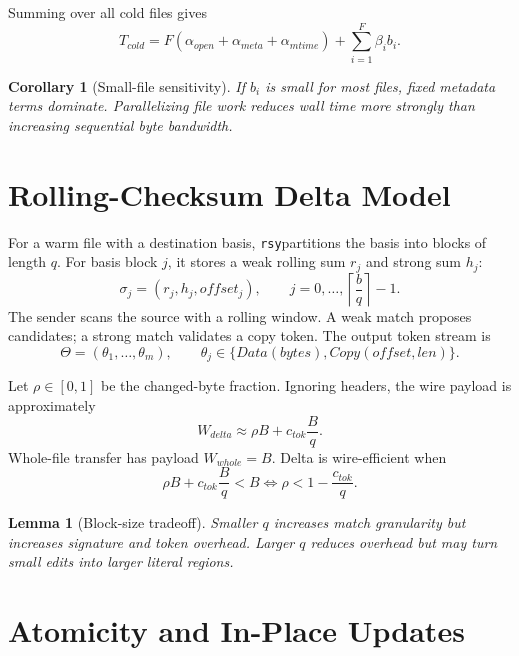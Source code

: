 \documentclass[11pt]{article}
\newtheorem{lemma}{Lemma}
\newtheorem{corollary}{Corollary}
\newcommand{\rsy}{\texttt{rsy}}
\begin{document}
Summing over all cold files gives
\begin{equation}
  T_{cold} = F(\alpha_{open}+\alpha_{meta}+\alpha_{mtime}) + \sum_{i=1}^{F}\beta_i b_i.
\end{equation}

\begin{corollary}[Small-file sensitivity]
If $b_i$ is small for most files, fixed metadata terms dominate. Parallelizing file work reduces wall time more strongly than increasing sequential byte bandwidth.
\end{corollary}

\section{Rolling-Checksum Delta Model}

For a warm file with a destination basis, \rsy partitions the basis into blocks of length $q$. For basis block $j$, it stores a weak rolling sum $r_j$ and strong sum $h_j$:
\begin{equation}
  \sigma_j=(r_j,h_j,offset_j), \qquad j=0,\ldots,\left\lceil\frac{b}{q}\right\rceil-1.
\end{equation}
The sender scans the source with a rolling window. A weak match proposes candidates; a strong match validates a copy token. The output token stream is
\begin{equation}
  \Theta = (\theta_1,\ldots,\theta_m), \qquad \theta_j\in\{Data(bytes),Copy(offset,len)\}.
\end{equation}

Let $\rho\in[0,1]$ be the changed-byte fraction. Ignoring headers, the wire payload is approximately
\begin{equation}
  W_{delta} \approx \rho B + c_{tok}\frac{B}{q}.
\end{equation}
Whole-file transfer has payload $W_{whole}=B$. Delta is wire-efficient when
\begin{equation}
  \rho B + c_{tok}\frac{B}{q} < B
  \iff
  \rho < 1-\frac{c_{tok}}{q}.
\end{equation}

\begin{lemma}[Block-size tradeoff]
Smaller $q$ increases match granularity but increases signature and token overhead. Larger $q$ reduces overhead but may turn small edits into larger literal regions.
\end{lemma}

\section{Atomicity and In-Place Updates}
\end{document}
